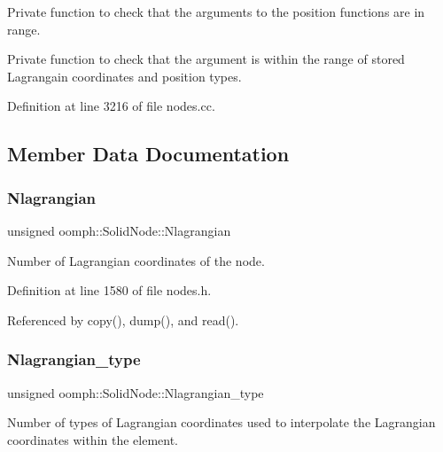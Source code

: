 Private function to check that the arguments to the position functions are in range. 

Private function to check that the argument is within the range of stored Lagrangain coordinates and position types. 

Definition at line 3216 of file nodes.\+cc.



\subsection{Member Data Documentation}
\mbox{\label{classoomph_1_1SolidNode_a155e729f069278a17a2828690ed67904}} 
\subsubsection{\texorpdfstring{Nlagrangian}{Nlagrangian}}
{\footnotesize\ttfamily unsigned oomph\+::\+Solid\+Node\+::\+Nlagrangian\hspace{0.3cm}{\ttfamily [protected]}}



Number of Lagrangian coordinates of the node. 



Definition at line 1580 of file nodes.\+h.



Referenced by copy(), dump(), and read().

\mbox{\label{classoomph_1_1SolidNode_a6676ab16593ad3d062ac8e29906d7786}} 
\subsubsection{\texorpdfstring{Nlagrangian\+\_\+type}{Nlagrangian\_type}}
{\footnotesize\ttfamily unsigned oomph\+::\+Solid\+Node\+::\+Nlagrangian\+\_\+type\hspace{0.3cm}{\ttfamily [protected]}}



Number of types of Lagrangian coordinates used to interpolate the Lagrangian coordinates within the element. 




